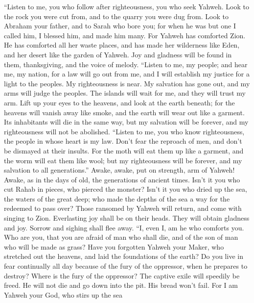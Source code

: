  ``Listen to me, you who follow after righteousness, you who
seek Yahweh. Look to the rock you were cut from, and to the quarry you
were dug from.  Look to Abraham your father, and to Sarah
who bore you; for when he was but one I called him, I blessed him, and
made him many.  For Yahweh has comforted Zion. He has
comforted all her waste places, and has made her wilderness like Eden,
and her desert like the garden of Yahweh. Joy and gladness will be found
in them, thanksgiving, and the voice of melody.  ``Listen to
me, my people; and hear me, my nation, for a law will go out from me,
and I will establish my justice for a light to the peoples. 
My righteousness is near. My salvation has gone out, and my arms will
judge the peoples. The islands will wait for me, and they will trust my
arm.  Lift up your eyes to the heavens, and look at the
earth beneath; for the heavens will vanish away like smoke, and the
earth will wear out like a garment. Its inhabitants will die in the same
way, but my salvation will be forever, and my righteousness will not be
abolished.  ``Listen to me, you who know righteousness, the
people in whose heart is my law. Don't fear the reproach of men, and
don't be dismayed at their insults.  For the moth will eat
them up like a garment, and the worm will eat them like wool; but my
righteousness will be forever, and my salvation to all generations.''
 Awake, awake, put on strength, arm of Yahweh! Awake, as in
the days of old, the generations of ancient times. Isn't it you who cut
Rahab in pieces, who pierced the monster?  Isn't it you who
dried up the sea, the waters of the great deep; who made the depths of
the sea a way for the redeemed to pass over?  Those
ransomed by Yahweh will return, and come with singing to Zion.
Everlasting joy shall be on their heads. They will obtain gladness and
joy. Sorrow and sighing shall flee away.  ``I, even I, am
he who comforts you. Who are you, that you are afraid of man who shall
die, and of the son of man who will be made as grass?  Have
you forgotten Yahweh your Maker, who stretched out the heavens, and laid
the foundations of the earth? Do you live in fear continually all day
because of the fury of the oppressor, when he prepares to destroy? Where
is the fury of the oppressor?  The captive exile will
speedily be freed. He will not die and go down into the pit. His bread
won't fail.  For I am Yahweh your God, who stirs up the sea
